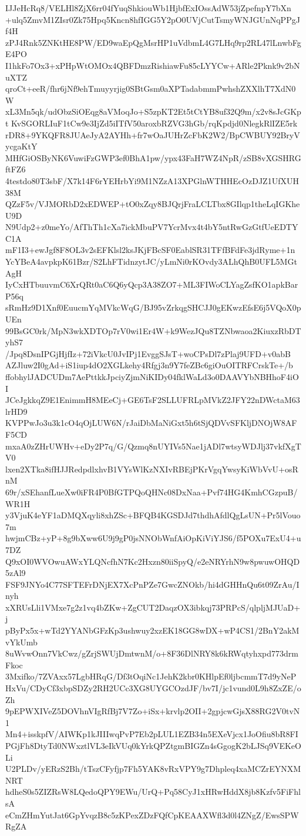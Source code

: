 IJJeHcRq8/VELHl8ZjX6rr04fYuqShkiouWb1HjbfExIOssAdW53jZpefnpY7bXn
+ulq5ZmvM1ZIsr0Zk75Hpq5Kncn8hfIGG5Y2pO0UVjCutTsmyWNJGUnNqPPgJf4H
zPJ4Rnk5ZNKtHE8PW/ED9waEpQgMsrHP1uVdbmL4G7LHq9rp2RL47lLnwbFgE4PO
I1hkFo7Ox3+xPHpWtOMOx4QBFDmzRishiawFu85cLYYCw+ARle2Pknk9v2bNuXTZ
qroCt+eeR/fhr6jNf9ehTmuyyrjig0SBtGsm0aXPTadabmmPwhshZXXlhT7XdN0W
xL3Mn5qk/udObzSiOEqg8aVMoqJo+S5zpKT2Et5tCtYB8uf32Q9m/x2v8sJcGKpt
KvSGORLIuF1tCw9e3IjZd5iITfV50aroxbRZVG3hGb/rqKpdjd0NlegkRlIZE5rk
rDR8+9YKQFR8JUAeJyA2AYHh+fr7wOaJUHrZcFbK2W2/BpCWBUY92BryVycgaKtY
MHfGiOSByNK6VuwiFzGWP3ef0BhA1pw/ypx43FaH7WZ4NpR/zSB8vXGSHRGftFZ6
4testdo80T3sbF/X7k14F6rYEHrbYi9M1NZzA13XPGlnWTHHEcOzDJZ1UfXUH38M
QZzF5v/VJMORbD2xEDWEP+tO0xZqy8BJQrjFraLCLTbx8GIlqp1theLqIGKheU9D
N9Udp2+z0meYo/AfThTh1cXa7ickMbuPV7YcrMvx4t4bY5ntRwGzGtfUeEDTYC1A
mF1I3+ewJgf8F8OL3v2sEFKlsl2ksJKjFBcSF0EablSR31TFfBFdFe3jdRyme+1n
YcYBeA4avpkpK61Bzr/S2LhFTidnzytJC/yLmNi0rKOvdy3ALhQhB0UFL5MGtAgH
IyCxHTbuuvmC6XrQRt0aC6Q6yQcp3A38ZO7+ML3FIWoCLYagZsfKO1apkBarP56q
sRmHz9D1Xnf0EuucmYqMVkcWqG/BJ95vZrkqgSHCJJ0gEKwzEfsE6j5VQoX0pUEn
99BsGC0rk/MpN3wkXDTOp7rV0wi1Er4W+k9WezJQu8TZNbwaoa2KiuxzRbDTyhS7
/Jpq8DsnIPGjHjfIz+72iVkcU0JvIPj1EvggSJsT+woCPsDl7zPlaj9UFD+v0abB
AZJluw2I0gAd+iS1iup4dO2XGLkehy4Rfgj3n9Y7feZBc6giOuOITRFCrskTe+/b
ffobhylJADCUDm7AePttkkJpciyZjmNiKIDy04fklWaLd3o0DAAVYbNBHhoF4iOI
JCeJgkkqZ9E1EnimmH8MEeCj+GE6TsF2SLLUFRLpMVkZ2JFY22nDWctaM63lrHD9
KVPPwJo3u3k1cO4qOjLUW6N/rJaiDbMaNiGxt5h6tSjQDVvSFKljDNOjW8AFF5CD
mxaA0zZHrUWHv+eDy2P7q/G/Qzmq8nUYIVs5Nae1jADl7wtsyWDJlj37vkfXgTV0
lxen2XTka8ifHJJRedpdlxhvB1VYsWlKzNXIvRBEjPKrVgqYwsyKiWbVvU+osRnM
69r/xSEhanfLueXw0iFR4P0BfGTPQoQHNc08DxNaa+Pvf74HG4KmhCGzpuB/WR1H
y3VjuK4eYF1aDMQXqyli8xhZSc+BFQB4KGSDJd7thdhAfdlQgLsUN+Pr5lVouo7m
hwjmCBz+yP+8g9bXww6U9j9gP0jsNNObWnfAiOpKiViYJS6/f5POXu7ExU4+u7DZ
Q9xOI0WVOwuAWxYLQNcfhN7Kc2Hxzn80iiSpyQ/e2eNRYrhN9w8pwuwOHQD5zAl9
FSF9JNYo4C77SFTEFrDNjEX7XcPnPZe7GwcZNOkb/hi4dGHHnQu6t09ZrAu/Inyh
xXRUsLli1VMxe7g2z1vq4bZKw+ZgCUT2DaqzOX3ibkqj73PRPcS/qlpljMJUaD+j
pByPx5x+wTd2YYANbGFzKp3ushwuy2xzEK18GG8wDX+wP4CS1/2BnY2akMvYkUmb
8uWvwOnn7VkCwz/gZrjSWUjDmtwnM/o+8F36DlNRY8k6kRWqtyhxpd773drmFkoc
3Mxifko/7ZVAxx57LgbHRqG/Df3tOqiNc1JehK2kbr0KHlpEf0ljbcmmT7d9yNeP
HxVu/CDyCf3xbpSDZy2RH2UCc3XG8UYGCOzdJF/bv7I/jc1vund0L9h8ZxZE/oZh
9pEPWXIVeZ5DOVhnVIgRfBj7V7Zo+iSx+krvlp2OII+2gpjcwGjsX88RG2V0tvN1
Mn4+isskpfV/AIWKp1kJIIIwqPvP7Eb2pLUL1EZB34n5EXeVjcx1JoOfiu8bR8FI
PGjFh8DtyTd0NWxztlVL3eIkVUq0kYrkQPZtgmBIGZn4sGgogK2bLJSq9VEKeOLi
U2PLDv/yERzS2Bh/tTszCFyfjp7Fh5YAK8vRxVPY9g7Dhpleq4xaMCZrEYNXMNRT
hdheS0s5ZIZRsW8LQedoQPY9EWu/UrQ+Pq58CyJ1xHRwHddX8jb8Kzfv5FiFhlsA
eCmZHmYutJat6GpYvqzB8c5zKPexZDzFQfCpKEAAXWfl3d0l4ZNgZ/EwsSPWRgZA
